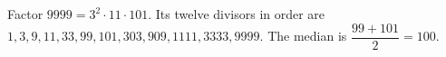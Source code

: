 Factor $9999=3^2\cdot11\cdot101$. Its twelve divisors in order are $1,3,9,11,33,99,101,303,909,1111,3333,9999$. The median is $\dfrac{99+101}{2}=\boxed{100}$.
